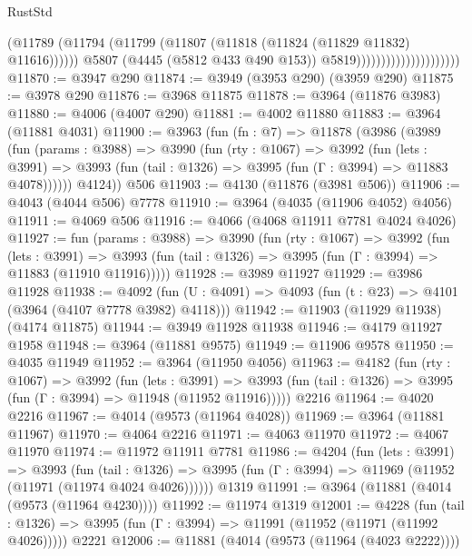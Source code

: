 \begin{lexlean}{RustStd}
\begin{coremodule}
                                              (@11789
                                                (@11794
                                                  (@11799
                                                    (@11807
                                                      (@11818 (@11824 (@11829 @11832) @11616))))))
                                              @5807
                                              (@4445 (@5812 @433 @490 @153))
                                              @5819)))))))))))))))))))))
@11870 := @3947 @290
@11874 := @3949 (@3953 @290) (@3959 @290)
@11875 := @3978 @290
@11876 := @3968 @11875
@11878 := @3964 (@11876 @3983)
@11880 := @4006 (@4007 @290)
@11881 := @4002 @11880
@11883 := @3964 (@11881 @4031)
@11900 := @3963
    (fun (fn : @7) =>
    @11878
      (@3986
        (@3989
          (fun (params : @3988) =>
          @3990
            (fun (rty : @1067) =>
            @3992
              (fun (lets : @3991) =>
              @3993 (fun (tail : @1326) => @3995 (fun (Γ : @3994) => @11883 @4078))))))
        @4124))
    @506
@11903 := @4130 (@11876 (@3981 @506))
@11906 := @4043 (@4044 @506) @7778
@11910 := @3964 (@4035 (@11906 @4052) @4056)
@11911 := @4069 @506
@11916 := @4066 (@4068 @11911 @7781 @4024 @4026)
@11927 := fun (params : @3988) =>
  @3990
    (fun (rty : @1067) =>
    @3992
      (fun (lets : @3991) =>
      @3993 (fun (tail : @1326) => @3995 (fun (Γ : @3994) => @11883 (@11910 @11916)))))
@11928 := @3989 @11927
@11929 := @3986 @11928
@11938 := @4092
    (fun (U : @4091) => @4093 (fun (t : @23) => @4101 (@3964 (@4107 @7778 @3982) @4118)))
@11942 := @11903 (@11929 @11938) (@4174 @11875)
@11944 := @3949 @11928 @11938
@11946 := @4179 @11927 @1958
@11948 := @3964 (@11881 @9575)
@11949 := @11906 @9578
@11950 := @4035 @11949
@11952 := @3964 (@11950 @4056)
@11963 := @4182
    (fun (rty : @1067) =>
    @3992
      (fun (lets : @3991) =>
      @3993 (fun (tail : @1326) => @3995 (fun (Γ : @3994) => @11948 (@11952 @11916)))))
    @2216
@11964 := @4020 @2216
@11967 := @4014 (@9573 (@11964 @4028))
@11969 := @3964 (@11881 @11967)
@11970 := @4064 @2216
@11971 := @4063 @11970
@11972 := @4067 @11970
@11974 := @11972 @11911 @7781
@11986 := @4204
    (fun (lets : @3991) =>
    @3993
      (fun (tail : @1326) =>
      @3995 (fun (Γ : @3994) => @11969 (@11952 (@11971 (@11974 @4024 @4026))))))
    @1319
@11991 := @3964 (@11881 (@4014 (@9573 (@11964 @4230))))
@11992 := @11974 @1319
@12001 := @4228
    (fun (tail : @1326) => @3995 (fun (Γ : @3994) => @11991 (@11952 (@11971 (@11992 @4026)))))
    @2221
@12006 := @11881 (@4014 (@9573 (@11964 (@4023 @2222))))

\end{coremodule}
\end{lexlean}
